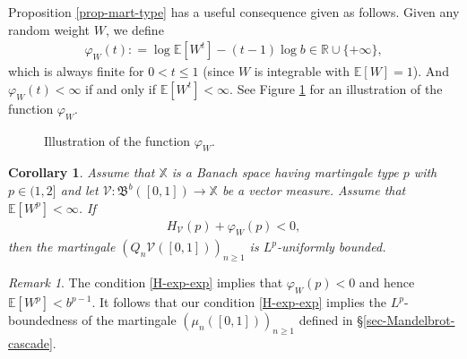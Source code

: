 \documentclass[12pt]{amsart}
\newtheorem{corollary}[theorem]{Corollary}
\theoremstyle{definition}
\theoremstyle{remark}
\newtheorem*{remark*}{Remark}
\newcommand{\R}{\mathbb{R}}
\newcommand{\N}{\mathbb{N}}
\newcommand{\E}{\mathbb{E}}
\newcommand{\fX}{\mathbb{X}}
\newcommand{\Ab}{\mathcal{A}}
\numberwithin{equation}{section}
\begin{document}
Proposition \ref{prop-mart-type} has a  useful consequence given as follows.  Given any random weight $W$, we define 
 \begin{align}\label{def-phi-W}
\varphi_W(t): = \log \E[W^t] - (t-1) \log b \in \R\cup\{+\infty\}, 
\end{align}
which is always finite for $0 < t \le 1$ (since $W$ is integrable with $\E[W]=1$). And $\varphi_W(t)<\infty$ if and only if $\E[W^t]<\infty$.    See Figure \ref{phi-graph} for an illustration of the function $\varphi_W$. 

\begin{figure}[H]
\caption{Illustration of the function  $\varphi_W$.}\label{phi-graph}
\end{figure}




\begin{corollary}\label{cor-HM-comp}
Assume that $\fX$ is a  Banach space  having martingale type $p$ with $p \in (1,2]$ and let $\mathcal{V}: \mathfrak{B}^b([0,1])\rightarrow \fX$ be a vector measure.  Assume that $\E[W^p]<\infty$.  If
\begin{align}\label{H-exp-exp}
 H_\mathcal{V}(p) +  \varphi_W(p) <   0, 
\end{align}
then the martingale $(Q_n \mathcal{V}([0,1]))_{n\ge 1}$ is $L^p$-uniformly bounded. 
\end{corollary}



\begin{remark*}
The condition  \eqref{H-exp-exp} implies that $\varphi_W(p)< 0$ and hence $\E[W^p]<b^{p-1}$.  It follows that our condition \eqref{H-exp-exp} implies the $L^p$-boundedness of the martingale $(\mu_n([0,1]))_{n\ge 1}$ defined in \S \ref{sec-Mandelbrot-cascade}. 
\end{remark*}

\end{document}
